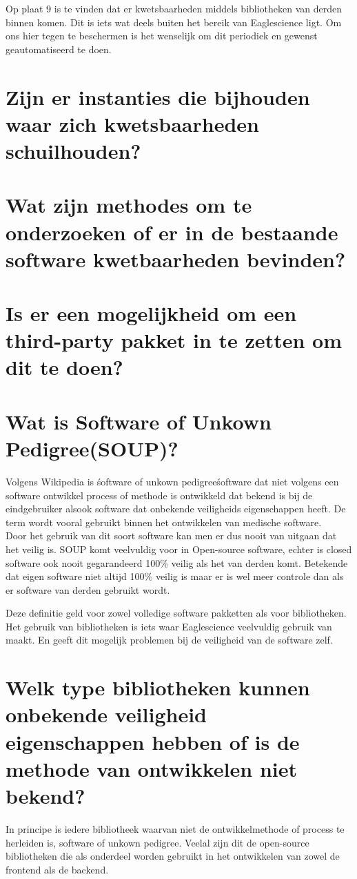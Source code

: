 Op plaat 9 is te vinden dat er kwetsbaarheden middels bibliotheken van derden binnen komen. Dit is iets wat deels buiten het bereik van Eaglescience ligt. Om ons hier tegen te beschermen is het wenselijk om dit periodiek en gewenst geautomatiseerd te doen.



\section{Zijn er instanties die bijhouden waar zich kwetsbaarheden schuilhouden?}
\section{Wat zijn methodes om te onderzoeken of er in de bestaande software kwetbaarheden bevinden?}
\section{Is er een mogelijkheid om een third-party pakket in te zetten om dit te doen?}




\section{Wat is Software of Unkown Pedigree(SOUP)?}
Volgens Wikipedia is \'software of unkown pedigree\' software dat niet volgens een software ontwikkel process of methode is ontwikkeld dat bekend is bij de eindgebruiker alsook software dat onbekende veiligheids eigenschappen heeft. De term wordt vooral gebruikt binnen het ontwikkelen van medische software.\\  %
Door het gebruik van dit soort software kan men er dus nooit van uitgaan dat het veilig is.  SOUP komt veelvuldig voor in Open-source software, echter is closed software ook nooit gegarandeerd 100\% veilig als het van derden komt. Betekende dat eigen software niet altijd 100\% veilig is maar er is wel meer controle dan als er software van derden gebruikt wordt.

Deze definitie geld voor zowel volledige software pakketten als voor bibliotheken. Het gebruik van bibliotheken is iets waar Eaglescience veelvuldig gebruik van maakt. En geeft dit mogelijk problemen bij de veiligheid van de software zelf.

\section{Welk type bibliotheken kunnen onbekende veiligheid eigenschappen hebben of is de methode van ontwikkelen niet bekend?}
In principe is iedere bibliotheek waarvan niet de ontwikkelmethode of process te herleiden is, software of unkown pedigree. Veelal zijn dit de open-source bibliotheken die als onderdeel worden gebruikt in het ontwikkelen van zowel de frontend als de backend.

